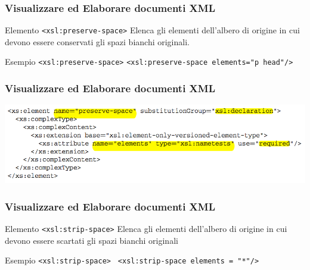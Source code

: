 \begin{frame}
    \frametitle{Visualizzare ed Elaborare documenti XML}
    \addtocounter{nframe}{1}
    

     \begin{block}{Elemento \texttt{<xsl:preserve-space>}}
         Elenca gli elementi dell'albero di origine in cui devono essere conservati gli spazi bianchi originali.
     \end{block}

     \begin{block}{Esempio \texttt{<xsl:preserve-space>}}
        \texttt{<xsl:preserve-space elements="p head"/>}
    \end{block}

\end{frame}

\begin{frame}
    \frametitle{Visualizzare ed Elaborare documenti XML}
    \addtocounter{nframe}{1}
    
    \begin{center}
        \includegraphics[width=.95\textwidth]{imgs/Schema-preserve-space.png}
    \end{center}

\end{frame}


\begin{frame}
    \frametitle{Visualizzare ed Elaborare documenti XML}
    \addtocounter{nframe}{1}
    

     \begin{block}{Elemento \texttt{<xsl:strip-space>}}
        Elenca gli elementi dell'albero di origine in cui devono essere scartati gli spazi bianchi originali
     \end{block}

     \begin{block}{Esempio \texttt{<xsl:strip-space>}}
       \texttt{ <xsl:strip-space elements = "*"/>}
     \end{block}

\end{frame}

